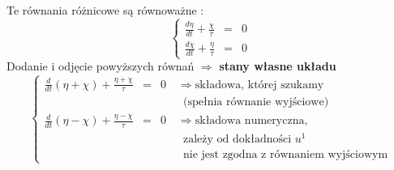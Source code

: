 \begin{frame}
	Te równania różnicowe są równoważne :
    $$\left\{\begin{array}{lcl}
      \frac{d\eta}{dt}+\frac{\chi}{\tau}&=&0\\
      \frac{d\chi}{dt}+\frac{\eta}{\tau}&=&0
    \end{array}\right.$$
    Dodanie i odjęcie powyższych równań $\Rightarrow$ \quad \textbf{stany własne układu}
    $$\left\{\begin{array}{lcl}
      \frac{d}{dt}(\eta+\chi)+\frac{\eta+\chi}{\tau} & = & 0 \quad \Rightarrow \text{składowa, której szukamy }\\
       & & \qquad \text{(spełnia równanie wyjściowe)}\\
      \frac{d}{dt}(\eta-\chi)+\frac{\eta-\chi}{\tau} & = & 0 \quad \Rightarrow \text{składowa numeryczna,} \\
      & & \qquad \text{zależy od dokładności } u^1\\
      & & \qquad \text{nie jest zgodna z równaniem wyjściowym}
    \end{array}\right.$$
\end{frame}
